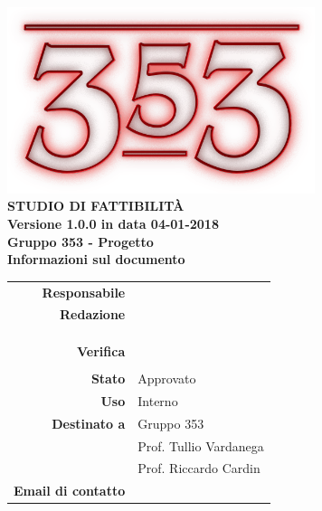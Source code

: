\documentclass[openany, a4paper, 12pt]{report}
\begin{document}
\begin{titlepage}
	\centering
	\vfill
	{
		\bfseries
		\vskip2cm
		\includegraphics[width=9cm]{../../common/images/logo.png} \\
		\vfill
		\Huge{STUDIO DI FATTIBILITÀ}\\
		\vfill
		\Large Versione 1.0.0 in data 04-01-2018\\
		\large Gruppo 353 - Progetto \progetto \\
		\vfill
	\normalsize Informazioni sul documento\\
\begin{table}[htbp]
	\centering
	\renewcommand\arraystretch{1.2}
	\begin{tabular}{r|l}
		\hline
		\textbf{Responsabile}	& \Parwinder\\
		
		\textbf{Redazione} 		& \Davide \\
								& \Elena \\
								& \Gianluca \\
								& \Riccardo \\
								
		\textbf{Verifica} 		& \Mirco \\
								& \Valentina \\
				
							
		\textbf{Stato} 			& Approvato\\
		
		\textbf{Uso}			& Interno\\
		
		\textbf{Destinato a}   	& Gruppo 353\\
								& Prof. Tullio Vardanega\\
								& Prof. Riccardo Cardin\\
		
				\textbf{Email di contatto}	& \mailgroup
	\end{tabular}
\end{table}
		\vfill
	}    
\end{titlepage}

\tableofcontents
\newpage
{}









 
\end{document}
